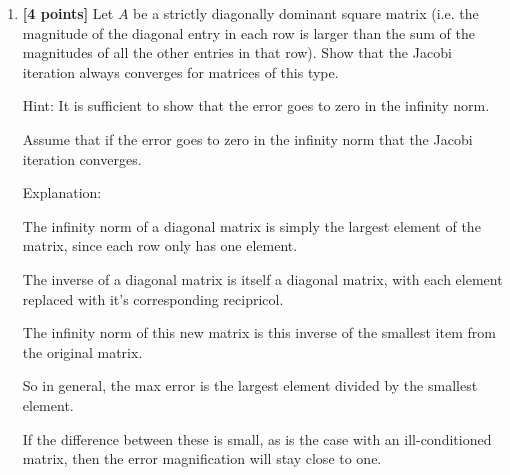 \documentclass{article}
\begin{document}
\begin{enumerate}
\begin{enumerate}
\begin{mdframed}[style=MyFrame]
\begin{equation*}
\Vert A \Vert_{1} = |-9| + |0| + |0| + |-5| = 14
\end{equation*}
\begin{equation*}
\Vert A^{-1} \Vert_{1} = |225| + |45| + |9| + |1| = 1279.25
\end{equation*}
\begin{equation*}
\displaystyle \kappa_{1} (A) = 14*1279.25 = 17909.5
\end{equation*}

Using the same error values calculated before. Yes, the actual error is within this boundary as well (it is larger than the previous upper bound so the same conclusion applies).

\end{mdframed}

\end{enumerate}

{\bf Note}: You can use the file {\tt a3q1.m} to ensure that you are working with the correct $A$ and $b$ values.

\medskip

\item {\bf [4 points]} Let $A$ be a strictly diagonally dominant square matrix (i.e. the magnitude of the diagonal entry in each row is larger than the sum of the magnitudes of all the other entries in that row). Show that the Jacobi iteration always converges for matrices of this type.

Hint: It is sufficient to show that the error goes to zero in the infinity norm. \newline

\begin{mdframed}[style=MyFrame]
  Assume that if the error goes to zero in the infinity norm that the Jacobi iteration converges.

Explanation:

The infinity norm of a diagonal matrix is simply the largest element of the matrix, since each row only has one element.

The inverse of a diagonal matrix is itself a diagonal matrix, with each element replaced with it's corresponding recipricol.

The infinity norm of this new matrix is this inverse of the smallest item from the original matrix.

So in general, the max error is the largest element divided by the smallest element.

If the difference between these is small, as is the case with an ill-conditioned matrix, then the error magnification will stay close to one.


\end{mdframed}
\end{enumerate}
\end{document}
